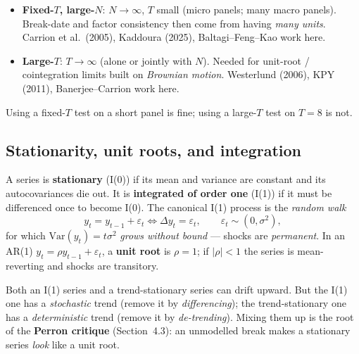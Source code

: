 \documentclass[11pt,a4paper]{article}
\newcommand{\Ito}{I(1)}
\newcommand{\Izero}{I(0)}
\newcommand{\hlt}[2]{\textcolor{#1}{\textbf{#2}}}
\theoremstyle{definition}
\begin{document}
\begin{definition}
\begin{itemize}[leftmargin=1.2em,itemsep=1pt]
 \item \hlt{cblue}{Fixed-$T$, large-$N$}: $N\to\infty$, $T$ small (micro panels; many macro panels).
 Break-date and factor consistency then come from having \emph{many units}. Carrion et al.\ (2005),
 Kaddoura (2025), Baltagi--Feng--Kao work here.
 \item \hlt{cblue}{Large-$T$}: $T\to\infty$ (alone or jointly with $N$). Needed for unit-root /
 cointegration limits built on \emph{Brownian motion}. Westerlund (2006), KPY (2011),
 Banerjee--Carrion work here.
\end{itemize}
Using a fixed-$T$ test on a short panel is fine; using a large-$T$ test on $T=8$ is not.
\end{definition}

\subsection{Stationarity, unit roots, and integration}
A series is \hlt{cteal}{stationary} (\Izero) if its mean and variance are constant and its
autocovariances die out. It is \hlt{cred}{integrated of order one} (\Ito) if it must be differenced
once to become \Izero. The canonical \Ito{} process is the \emph{random walk}
\begin{equation}
y_t=y_{t-1}+\varepsilon_t \iff \Delta y_t=\varepsilon_t,\qquad \varepsilon_t\sim(0,\sigma^2),
\end{equation}
for which $\mathrm{Var}(y_t)=t\sigma^2$ \emph{grows without bound} --- shocks are \emph{permanent}.
In an AR(1) $y_t=\rho y_{t-1}+\varepsilon_t$, a \hlt{cred}{unit root} is $\rho=1$; if $|\rho|<1$ the
series is mean-reverting and shocks are transitory.

\begin{begbox}
Both an \Ito{} series and a trend-stationary series can drift upward. But the \Ito{} one has a
\emph{stochastic} trend (remove it by \emph{differencing}); the trend-stationary one has a
\emph{deterministic} trend (remove it by \emph{de-trending}). Mixing them up is the root of the
\hlt{cred}{Perron critique} (Section~4.3): an unmodelled break makes a stationary series \emph{look}
like a unit root.
\end{begbox}
\end{document}
